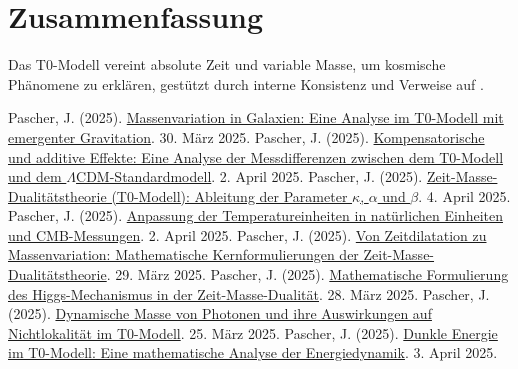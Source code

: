 \documentclass[a4paper,12pt]{article}
\theoremstyle{definition}
\theoremstyle{remark}
\begin{document}
	\section{Zusammenfassung}
	
	Das T0-Modell vereint absolute Zeit und variable Masse, um kosmische Phänomene zu erklären, gestützt durch interne Konsistenz und Verweise auf \cite{pascher_galaxies_2025, pascher_params_2025, pascher_messdifferenzen_2025}.
	
	\begin{thebibliography}{99}
		 Pascher, J. (2025). \href{https://github.com/jpascher/T0-Time-Mass-Duality/tree/main/2/pdf/Deutsch/Massenvariation in Galaxien.pdf}{Massenvariation in Galaxien: Eine Analyse im T0-Modell mit emergenter Gravitation}. 30. März 2025.
		 Pascher, J. (2025). \href{https://github.com/jpascher/T0-Time-Mass-Duality/tree/main/2/pdf/Deutsch/Analyse der Messdifferenzen zwischen dem T0-Modell und dem Standardmodell.pdf}{Kompensatorische und additive Effekte: Eine Analyse der Messdifferenzen zwischen dem T0-Modell und dem \(\Lambda\)CDM-Standardmodell}. 2. April 2025.
		 Pascher, J. (2025). \href{https://github.com/jpascher/T0-Time-Mass-Duality/tree/main/2/pdf/Deutsch/Zeit-Masse-Dualitätstheorie (T0-Modell) Herleitung der Parameter kappa, alpha und beta.pdf}{Zeit-Masse-Dualitätstheorie (T0-Modell): Ableitung der Parameter \(\kappa\), \(\alpha\) und \(\beta\)}. 4. April 2025.
		 Pascher, J. (2025). \href{https://github.com/jpascher/T0-Time-Mass-Duality/tree/main/2/pdf/Deutsch/Anpassung von Temperatureinheiten in natürlichen Einheiten und CMB-Messungen.pdf}{Anpassung der Temperatureinheiten in natürlichen Einheiten und CMB-Messungen}. 2. April 2025.
		 Pascher, J. (2025). \href{https://github.com/jpascher/T0-Time-Mass-Duality/tree/main/2/pdf/Deutsch/Mathematische Formulierungen der Zeit-Masse-Dualitätstheorie mit Lagrange.pdf}{Von Zeitdilatation zu Massenvariation: Mathematische Kernformulierungen der Zeit-Masse-Dualitätstheorie}. 29. März 2025.
		 Pascher, J. (2025). \href{https://github.com/jpascher/T0-Time-Mass-Duality/tree/main/2/pdf/Deutsch/Mathematische Formulierung des Higgs-Mechanismus in der Zeit-Masse-Dualität.pdf}{Mathematische Formulierung des Higgs-Mechanismus in der Zeit-Masse-Dualität}. 28. März 2025.
		 Pascher, J. (2025). \href{https://github.com/jpascher/T0-Time-Mass-Duality/tree/main/2/pdf/Deutsch/Dynamische Masse von Photonen und ihre Implikationen für Nichtlokalität.tex}{Dynamische Masse von Photonen und ihre Auswirkungen auf Nichtlokalität im T0-Modell}. 25. März 2025.
		 Pascher, J. (2025). \href{https://github.com/jpascher/T0-Time-Mass-Duality/tree/main/2/pdf/Deutsch/Eine mathematische Analyse der Energiedynamik.pdf}{Dunkle Energie im T0-Modell: Eine mathematische Analyse der Energiedynamik}. 3. April 2025.
	\end{thebibliography}
	
\end{document}
